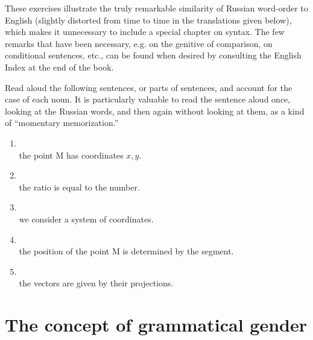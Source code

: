 These exercises illustrate the truly remarkable similarity of Russian word-order to English (slightly distorted from time to time in the translations given below), which makes it unnecessary to include a special chapter on syntax. The few remarks that have been necessary, e.g. on the genitive of comparison, on conditional sentences, etc., can be found when desired by consulting the English Index at the end of the book.

\begin{keybox}[Exercise 3.1]
Read aloud the following sentences, or parts of sentences, and account for the case of each noun. It is particularly valuable to read the sentence aloud once, looking at the Russian words, and then again without looking at them, as a kind of ``momentary memorization.''
\end{keybox}

\begin{enumerate}[label=\arabic*)]
\item {}\\
      the point M has coordinates $x,y$.
\item {}\\
      the ratio is equal to the number.
\item {}\\
      we consider a system of coordinates.
\item {}\\
      the position of the point M is determined by the segment.
\item {}\\
      the vectors are given by their projections.
\end{enumerate}

\section{The concept of grammatical gender}

